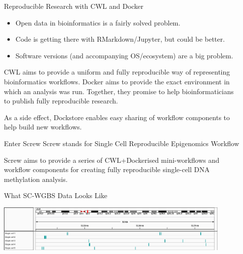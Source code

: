 \documentclass{beamer}
\begin{document}
\begin{frame}
\begin{columns}[t]
\begin{column}{.32\textwidth}
\begin{block}{Reproducible Research with CWL and Docker}
\begin{itemize}
\item Open data in bioinformatics is a fairly solved problem.
\item Code is getting there with RMarkdown/Jupyter, but could be better.
\item Software versions (and accompanying OS/ecosystem) are a big problem.
\end{itemize}
CWL aims to provide a uniform and fully reproducible way of representing bioinformatics workflows. Docker aims to provide the exact environment in which an analysis was run. Together, they promise to help bioinformaticians to publish fully reproducible research.

As a side effect, Dockstore enables easy sharing of workflow components to help build new workflows. 
\end{block}


\begin{block}{Enter Screw}
Screw stands for Single Cell Reproducible Epigenomics Workflow

Screw aims to provide a series of CWL+Dockerised mini-workflows and workflow components for creating fully reproducible single-cell DNA methylation analysis.
\end{block}


\begin{block}{What SC-WGBS Data Looks Like}
\begin{center}
\includegraphics[width=0.9\textwidth]{figures/igv_sc.png}
\end{center}

\end{block}





\end{column}


\begin{column}{.65\textwidth}
\vspace*{-\baselineskip}
  \begin{columns}[t,totalwidth=\textwidth]
    \begin{column}{.48\textwidth}
    

\end{column}
\end{columns}
\end{column}
\end{columns}
\end{frame}
\end{document}
